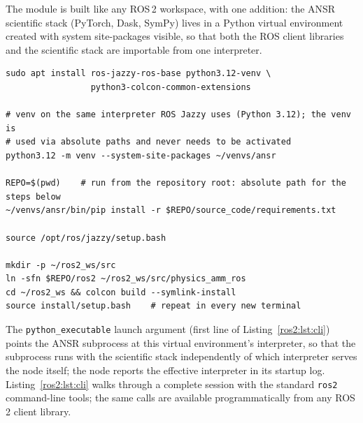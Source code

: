 The module is built like any ROS\,2 workspace, with one addition: the ANSR
scientific stack (PyTorch, Dask, SymPy) lives in a Python virtual
environment created with system site-packages visible, so that both the ROS
client libraries and the scientific stack are importable from one
interpreter.

\begin{lstlisting}[style=ros2shell, caption={Build recipe (Ubuntu 24.04,
  ROS\,2 Jazzy).}, label={ros2:lst:build}]
sudo apt install ros-jazzy-ros-base python3.12-venv \
                 python3-colcon-common-extensions

# venv on the same interpreter ROS Jazzy uses (Python 3.12); the venv is
# used via absolute paths and never needs to be activated
python3.12 -m venv --system-site-packages ~/venvs/ansr

REPO=$(pwd)    # run from the repository root: absolute path for the steps below
~/venvs/ansr/bin/pip install -r $REPO/source_code/requirements.txt

source /opt/ros/jazzy/setup.bash

mkdir -p ~/ros2_ws/src
ln -sfn $REPO/ros2 ~/ros2_ws/src/physics_amm_ros
cd ~/ros2_ws && colcon build --symlink-install
source install/setup.bash    # repeat in every new terminal
\end{lstlisting}

The \texttt{python\_executable} launch argument (first line of
Listing~\ref{ros2:lst:cli}) points the ANSR subprocess at this virtual
environment's interpreter, so that the subprocess runs with the scientific
stack independently of which interpreter serves the node itself; the node
reports the effective interpreter in its startup log.
Listing~\ref{ros2:lst:cli} walks through a complete session with the
standard \texttt{ros2} command-line tools; the same calls are available
programmatically from any ROS\,2 client library.

